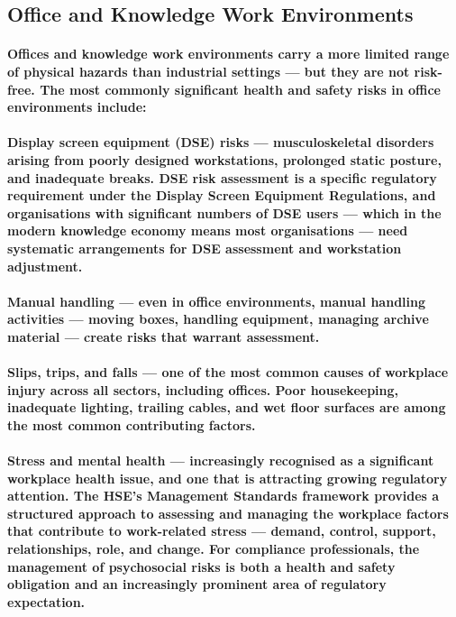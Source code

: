 \subsection{Office and Knowledge Work Environments}
\paragraph{Offices and knowledge work environments carry a more limited range of physical hazards than industrial settings — but they are not risk-free. The most commonly significant health and safety risks in office environments include:}
\paragraph{\textbf{Display screen equipment (DSE) risks} — musculoskeletal disorders arising from poorly designed workstations, prolonged static posture, and inadequate breaks. DSE risk assessment is a specific regulatory requirement under the Display Screen Equipment Regulations, and organisations with significant numbers of DSE users — which in the modern knowledge economy means most organisations — need systematic arrangements for DSE assessment and workstation adjustment.}
\paragraph{\textbf{Manual handling} — even in office environments, manual handling activities — moving boxes, handling equipment, managing archive material — create risks that warrant assessment.}
\paragraph{\textbf{Slips, trips, and falls} — one of the most common causes of workplace injury across all sectors, including offices. Poor housekeeping, inadequate lighting, trailing cables, and wet floor surfaces are among the most common contributing factors.}
\paragraph{\textbf{Stress and mental health} — increasingly recognised as a significant workplace health issue, and one that is attracting growing regulatory attention. The \textbf{HSE's Management Standards} framework provides a structured approach to assessing and managing the workplace factors that contribute to work-related stress — demand, control, support, relationships, role, and change. For compliance professionals, the management of psychosocial risks is both a health and safety obligation and an increasingly prominent area of regulatory expectation.}
